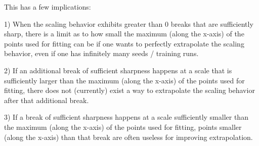 \documentclass{article} %
\begin{document}
This has a few implications:

\vspace{-1.8mm}

1) When the scaling behavior exhibits greater than 0 breaks that are sufficiently sharp, there is a limit as to how small the maximum (along the x-axis) of the points used for fitting can be if one wants to perfectly extrapolate the scaling behavior, even if one has infinitely many seeds / training runs.

\vspace{-1.8mm}

2) If an additional break of sufficient sharpness happens at a scale that is sufficiently larger than the maximum (along the x-axis) of the points used for fitting, there does not (currently) exist a way to extrapolate the scaling behavior after that additional break.

\vspace{-1.8mm}

3) If a break of sufficient sharpness happens at a scale sufficiently smaller than the maximum (along the x-axis) of the points used for fitting, points smaller (along the x-axis) than that break are often useless for improving extrapolation.




%
\vspace{-3.95mm}
\end{document}
